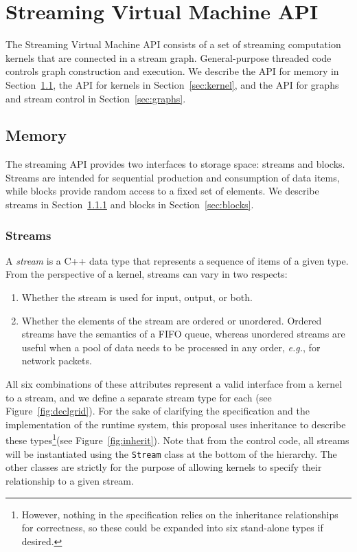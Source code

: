 \section{Streaming Virtual Machine API}

The Streaming Virtual Machine API consists of a set of streaming
computation kernels that are connected in a stream graph.
General-purpose threaded code controls graph construction and
execution.  We describe the API for memory in
Section~\ref{sec:memory}, the API for kernels in
Section~\ref{sec:kernel}, and the API for graphs and stream control in
Section~\ref{sec:graphs}.

\subsection{Memory}
\label{sec:memory}

The streaming API provides two interfaces to storage space: streams
and blocks.  Streams are intended for sequential production and
consumption of data items, while blocks provide random access to a
fixed set of elements.  We describe streams in
Section~\ref{sec:streams} and blocks in Section~\ref{sec:blocks}.

\subsubsection{Streams}
\label{sec:streams}

A {\it stream} is a C++ data type that represents a sequence of items
of a given type.  From the perspective of a kernel, streams can vary
in two respects:
\begin{enumerate}

\item Whether the stream is used for input, output, or both.

\item Whether the elements of the stream are ordered or unordered.
Ordered streams have the semantics of a FIFO queue, whereas unordered
streams are useful when a pool of data needs to be processed in any
order, {\it e.g.}, for network packets.

\end{enumerate}
All six combinations of these attributes represent a valid interface
from a kernel to a stream, and we define a separate stream type for
each (see Figure~\ref{fig:declgrid}).  For the sake of clarifying the
specification and the implementation of the runtime system, this
proposal uses inheritance to describe these types\footnote{However,
nothing in the specification relies on the inheritance relationships
for correctness, so these could be expanded into six stand-alone types
if desired.}(see Figure~\ref{fig:inherit}).  Note that from the
control code, all streams will be instantiated using the {\tt Stream}
class at the bottom of the hierarchy.  The other classes are strictly
for the purpose of allowing kernels to specify their relationship to a
given stream.

